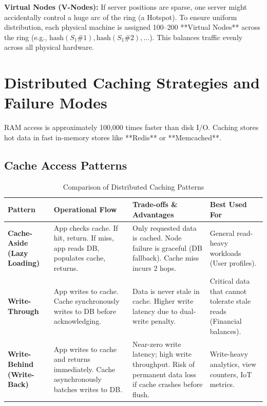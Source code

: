 \documentclass[10pt,journal,compsoc,onecolumn]{IEEEtran}
\begin{document}
\textbf{Virtual Nodes (V-Nodes):}
If server positions are sparse, one server might accidentally control a huge arc of the ring (a Hotspot). To ensure uniform distribution, each physical machine is assigned 100--200 **Virtual Nodes** across the ring (e.g., $\text{hash}(S_1\#1), \text{hash}(S_1\#2), \dots$). This balances traffic evenly across all physical hardware.

\section{Distributed Caching Strategies and Failure Modes}
\label{sec:caching}

RAM access is approximately 100,000 times faster than disk I/O. Caching stores hot data in fast in-memory stores like **Redis** or **Memcached**.

\subsection{Cache Access Patterns}

\begin{table}[htbp]
\caption{Comparison of Distributed Caching Patterns}
\label{tab:cache_patterns}
\centering
\begin{tabular}{p{2.8cm}p{4.2cm}p{4.5cm}l}
\toprule
\textbf{Pattern} & \textbf{Operational Flow} & \textbf{Trade-offs \& Advantages} & \textbf{Best Used For} \\
\midrule
\textbf{Cache-Aside (Lazy Loading)} & App checks cache. If hit, return. If miss, app reads DB, populates cache, returns. & Only requested data is cached. Node failure is graceful (DB fallback). Cache miss incurs 2 hops. & General read-heavy workloads (User profiles). \\
\midrule
\textbf{Write-Through} & App writes to cache. Cache synchronously writes to DB before acknowledging. & Data is never stale in cache. Higher write latency due to dual-write penalty. & Critical data that cannot tolerate stale reads (Financial balances). \\
\midrule
\textbf{Write-Behind (Write-Back)} & App writes to cache and returns immediately. Cache asynchronously batches writes to DB. & Near-zero write latency; high write throughput. Risk of permanent data loss if cache crashes before flush. & Write-heavy analytics, view counters, IoT metrics. \\
\bottomrule
\end{tabular}
\end{table}
\end{document}
